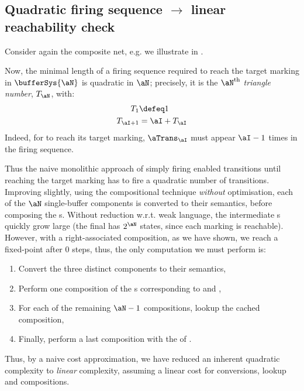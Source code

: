 \subsection{Quadratic firing sequence $\to$ linear reachability check}

Consider again the composite \bufferSys{-} net, e.g. we illustrate
 in .

\begin{figure}[ht]
    \centering
    \caption{}
    \label{fig:buffer4}
\end{figure}

Now, the minimal length of a firing sequence required to reach the target
marking in $\bufferSys{\aN}$ is quadratic in $\aN$; precisely, it is the
$\aN^\text{th}$ \emph{triangle number}, $T_\aN$, with:
\begin{align*}
    T_1 &\defeq 1\\
    T_{\aI + 1} &= \aI + T_\aI
\end{align*}
Indeed, for  to reach its target marking, $\aTrans_\aI$ must
appear $\aI - 1$ times in the firing sequence.

Thus the naive monolithic approach of simply firing enabled transitions until
reaching the target marking has to fire a quadratic number of transitions.
Improving slightly, using the compositional technique \emph{without}
optimisation, each of the $\aN$ single-buffer components is converted to their
\TNFA{} semantics, before composing the \TNFA{}s. Without reduction w.r.t. weak language, the
intermediate \TNFA{}s quickly grow large (the final \TNFA{} has $2^\aN$ states, since each
marking is reachable). However, with a right-associated composition, as we have
shown, we reach a fixed-point after $0$ steps, thus, the only computation we
must perform is:
\begin{enumerate}
    \item Convert the three distinct components to their \TNFA{}
semantics,
    \item Perform one composition of the \TNFA{}s corresponding to \bufferC{}
        and \rendC{},
    \item For each of the remaining $\aN - 1$ \bufferC{} compositions, lookup
        the cached composition,
    \item Finally, perform a last composition with the \TNFA{} of \lendC{}.
\end{enumerate}

Thus, by a naive cost approximation, we have reduced an inherent quadratic complexity to
\emph{linear} complexity, assuming a linear cost for conversions, lookup and compositions.

